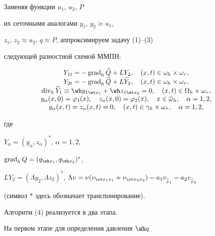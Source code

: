 Заменяя функции $u_1$, $u_2$, $P$


их сеточными аналогами $y_1$, $y_2\approx u_1$,


$z_1$, $z_2\approx u_2$, $q\approx P$, аппроксимируем задачу (1)--(3)


следующей разностной схемой ММПН:


\begin{equation}


\begin{array}{c}


Y_{1t}=-\Grad_h\widehat Q+LY_2,\quad


(x,t)\in\omega_h\times\omega_\tau,\\


Y_{2t}=-\Grad_h\widehat Q+L\widehat Y_2,\quad


(x,t)\in\omega_h\times\omega_\tau, \\


\Div_h\widehat Y_1\equiv\wh y_{1\wt x_1}+\wh z_{1\wt x_2}=0,


\quad (x,t)\in \Omega_h\times\omega_\tau,\\


y_\alpha(x,0)=\varphi_1(x),\quad z_\alpha(x,0)=\varphi_2(x),\quad


x\in\overline\omega_h,\quad \alpha=1,2,\\


y_\alpha(x,t)=z_\alpha(x,t)=0,\quad


(x,t)\in\gamma_h\times\omega_\tau,\quad\alpha=1,2,


\end{array}


\end{equation}


где


$Y_{\alpha}=(y_\alpha,z_\alpha)^{*}$, $\alpha=1,2$,


$\Grad_hQ=(q_{\wh x_1},q_{\wh x_2})^*$,


$LY_2=(\Lambda y_2,\Lambda z_2)^*$, $\Lambda v=\nu(v_{\ov x_1x_1}+


v_{\ov x_2x_2})-a_1v_{\overset{\circ}{x}{}_1}-


a_2v_{\overset{\circ}{x}{}_2}$


(символ $*$ здесь обозначает транспонирование).





Алгоритм (4) реализуется в два этапа.


На первом этапе для определения давления $\wh q$


